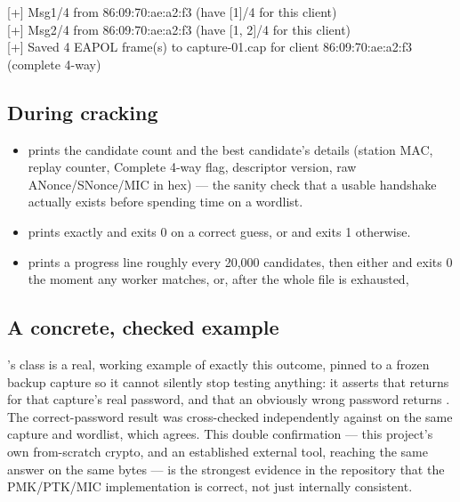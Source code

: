 \begin{console}
{}[+] Msg1/4 from 86:09:70:ae:a2:f3  (have [1]/4 for this client)\\
{}[+] Msg2/4 from 86:09:70:ae:a2:f3  (have [1, 2]/4 for this client)\\
{}[+] Saved 4 EAPOL frame(s) to capture-01.cap for client 86:09:70:ae:a2:f3 (complete 4-way)
\end{console}

\subsection{During cracking}
\begin{itemize}
\item {} prints the candidate count and the best candidate's details (station MAC, replay counter, Complete 4-way flag, descriptor version, raw ANonce/SNonce/MIC in hex) --- the sanity check that a usable handshake actually exists before spending time on a wordlist.
\item {} prints exactly  and exits 0 on a correct guess, or  and exits 1 otherwise.
\item {} prints a progress line roughly every 20,000 candidates, then either  and exits 0 the moment any worker matches, or, after the whole file is exhausted, 
\end{itemize}

\subsection{A concrete, checked example}
's  class is a real, working example of exactly this outcome, pinned to a frozen backup capture so it cannot silently stop testing anything: it asserts that  returns  for that capture's real password, and that an obviously wrong password returns . The correct-password result was cross-checked independently against  on the same capture and wordlist, which agrees. This double confirmation --- this project's own from-scratch crypto, and an established external tool, reaching the same answer on the same bytes --- is the strongest evidence in the repository that the PMK/PTK/MIC implementation is correct, not just internally consistent.


